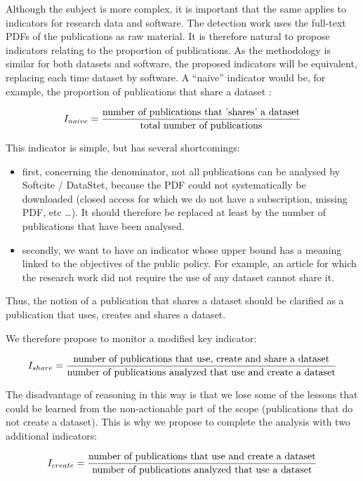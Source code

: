 \documentclass[
]{article}
\begin{document}
Although the subject is more complex, it is important that the same
applies to indicators for research data and software. The detection work
uses the full-text PDFs of the publications as raw material. It is
therefore natural to propose indicators relating to the proportion of
publications. As the methodology is similar for both datasets and
software, the proposed indicators will be equivalent, replacing each
time dataset by software. A ``naive'' indicator would be, for example,
the proportion of publications that share a dataset :

\[ I_{naive} = {\text{number of publications that 'shares' a dataset} \over \text{total number of publications}} \]

This indicator is simple, but has several shortcomings:

\begin{itemize}
\item
  first, concerning the denominator, not all publications can be
  analysed by Softcite / DataStet, because the PDF could not
  systematically be downloaded (closed access for which we do not have a
  subscription, missing PDF, etc \ldots). It should therefore be
  replaced at least by the number of publications that have been
  analysed.
\item
  secondly, we want to have an indicator whose upper bound has a meaning
  linked to the objectives of the public policy. For example, an article
  for which the research work did not require the use of any dataset
  cannot share it.
\end{itemize}

Thus, the notion of a publication that shares a dataset should be
clarified as a publication that uses, creates and shares a dataset.

We therefore propose to monitor a modified key indicator:

\[ I_{share} = {\text{number of publications that use, create and share a dataset} \over \text{number of publications analyzed that use and create a dataset}} \]

The disadvantage of reasoning in this way is that we lose some of the
lessons that could be learned from the non-actionable part of the scope
(publications that do not create a dataset). This is why we propose to
complete the analysis with two additional indicators:

\[ I_{create} = {\text{number of publications that use and create a dataset} \over \text{number of publications analyzed that use a dataset}} \]
\end{document}
